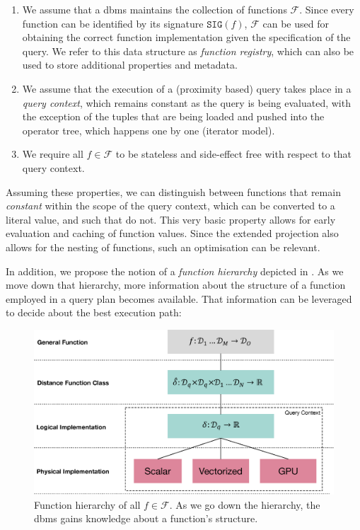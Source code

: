 \begin{enumerate}
    \item We assume that a \acrshort{dbms} maintains the collection of functions $\mathcal{F}$. Since every function can be identified by its signature $\mathtt{SIG}(f)$, $\mathcal{F}$ can be used for obtaining the correct function implementation given the specification of the query. We refer to this data structure as \emph{function registry}, which can also be used to store additional properties and metadata.
    \item We assume that the execution of a (proximity based) query takes place in a \emph{query context}, which remains constant as the query is being evaluated, with the exception of the tuples that are being loaded and pushed into the operator tree, which happens one by one (iterator model).
    \item We require all $f \in \mathcal{F}$ to be stateless and side-effect free with respect to that query context. 
\end{enumerate}

Assuming these properties, we can distinguish between functions that remain \emph{constant} within the scope of the query context, which can be converted to a literal value, and such that do not. This very basic property allows for early evaluation and caching of function values. Since the extended projection also allows for the nesting of functions, such an optimisation can be relevant.

In addition, we propose the notion of a \emph{function hierarchy} depicted in . As we move down that hierarchy, more information about the structure of a function employed in a query plan becomes available. That information can be leveraged to decide about the best execution path:

\begin{figure}[bt]
    \centering
    \includegraphics[width=\textwidth]{figures/function_hierarchy.eps}
    \caption{Function hierarchy of all $f \in \mathcal{F}$. As we go down the hierarchy, the \acrshort{dbms} gains knowledge about a function's structure.}
    \label{figure:function_hierarchy}
\end{figure}

